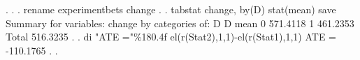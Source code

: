 . 
. 
. rename experimentbets change
{\smallskip}
. 
. tabstat change, by(D) stat(mean) save   
{\smallskip}
Summary for variables: change
     by categories of: D 
{\smallskip}
       D {\VBAR}      mean
       0 {\VBAR}  571.4118
       1 {\VBAR}  461.2353
   Total {\VBAR}  516.3235
{\smallskip}
. 
. di "ATE ="\%180.4f el(r(Stat2),1,1)-el(r(Stat1),1,1)
ATE =                 -110.1765
{\smallskip}
. 
.         
